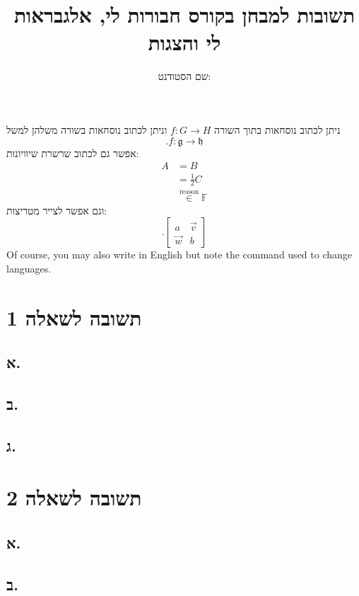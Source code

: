 \documentclass{article}
\title{תשובות למבחן בקורס חבורות לי, אלגבראות לי והצגות}
\author{שם הסטודנט:

}
\date{תאריך הגשה:

}
\begin{document}
\maketitle

ניתן
לכתוב נוסחאות בתוך השורה 
$f:G\rightarrow H$
וניתן לכתוב נוסחאות בשורה משלהן למשל
$$.f:\mathfrak g \rightarrow \mathfrak h$$
אפשר גם לכתוב שרשרת שיוויונות:
\begin{align*}
A & =B\\
 & =\frac{1}{2}C\\
 & \stackrel{\text{reason}}{\in}\mathbb F
\end{align*}
וגם אפשר לצייר מטריצות:
$$.\left[\begin{array}{cc}
a & \vec{v}\\
\vec{w} & b
\end{array}\right]$$
Of course, you may also write in English but note the command used to change languages.

\section*{תשובה לשאלה 1}

\subsection*{א.}

\subsection*{ב.}


\subsection*{ג.}




\section*{תשובה לשאלה 2}

\subsection*{א.}


\subsection*{ב.}
\end{document}
